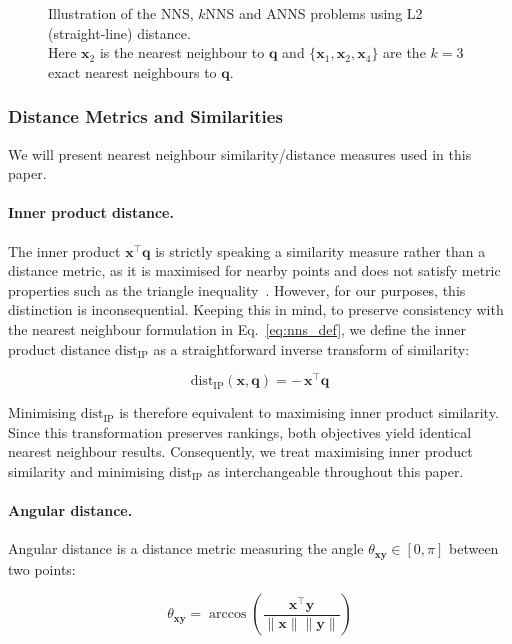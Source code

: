 \documentclass{article}
\newcommand{\bx}{\mathbf{x}}
\newcommand{\by}{\mathbf{y}}
\newcommand{\bq}{\mathbf{q}}
\newcommand{\distip}{\mathrm{dist}_{\mathrm{IP}}}
\newcommand{\dotxy}{\bx^\top \by}
\newcommand{\nbx}{\| \bx \|}
\newcommand{\nby}{\| \by \|}
\begin{document}
\begin{figure}[H]
    \centering
    
    \caption{Illustration of the NNS, $k$NNS and ANNS problems using L2 (straight-line) distance. \\ Here $\bx_{2}$ is the nearest neighbour to $\bq$ and $\{ \bx_{1}, \bx_{2}, \bx_{4} \}$ are the $k=3$ exact nearest neighbours to $\bq$.}
    \label{fig:nns-example}
\end{figure}

\subsubsection{Distance Metrics and Similarities}

We will present nearest neighbour similarity/distance measures used in this paper.

\paragraph{Inner product distance.}
The inner product $\bx^\top \bq$ is strictly speaking a similarity measure rather than a distance metric, as it is maximised for nearby points and does not satisfy metric properties such as the triangle inequality~\cite{chen2009similarity}. However, for our purposes, this distinction is inconsequential. Keeping this in mind, to preserve consistency with the nearest neighbour formulation in Eq.~\ref{eq:nns_def}, we define the inner product distance $\distip$ as a straightforward inverse transform of similarity:

\begin{equation}
\distip(\bx, \bq) = -\,\bx^\top \bq
\end{equation}

Minimising $\distip$ is therefore equivalent to maximising inner product similarity. Since this transformation preserves rankings, both objectives yield identical nearest neighbour results. Consequently, we treat maximising inner product similarity and minimising $\distip$ as interchangeable throughout this paper.

\paragraph{Angular distance.}

Angular distance is a distance metric measuring the angle $\theta_{\bx\by} \in [0, \pi]$ between two points:

\begin{equation}
    \theta_{\bx \by} = \arccos\!\left(\frac{\dotxy}{\nbx \nby}\right)
    \label{eq:angular-distance}
\end{equation}
\end{document}
